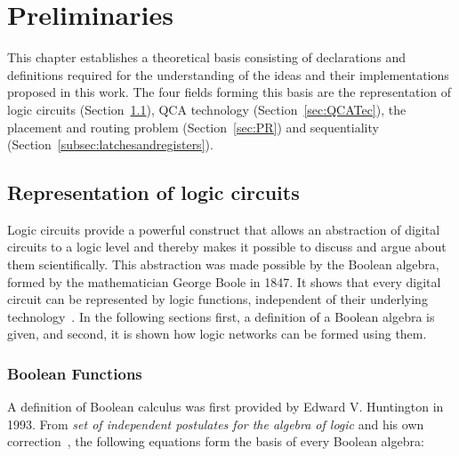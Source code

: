 \chapter{Preliminaries}\label{chapter:Preliminaries}
This chapter establishes a theoretical basis consisting of declarations and definitions required for the understanding of the ideas and their implementations proposed in this work. The four fields forming this basis are the representation of logic circuits (Section~\ref{sec:LogCirc}), QCA technology (Section~\ref{sec:QCATec}), the placement and routing problem (Section~\ref{sec:PR}) and sequentiality (Section~\ref{subsec:latchesandregisters}).

\section{Representation of logic circuits}\label{sec:LogCirc}
Logic circuits provide a powerful construct that allows an abstraction of digital circuits to a logic level and thereby makes it possible to discuss and argue about them scientifically. This abstraction was made possible by the Boolean algebra, formed by the mathematician George Boole in 1847. It shows that every digital circuit can be represented by logic functions, independent of their underlying technology~\cite{halmos2009introduction}. In the following sections first, a definition of a Boolean algebra is given, and second, it is shown how logic networks can be formed using them.

\subsection{Boolean Functions}\label{subsec:boolfunc}
A definition of Boolean calculus was first provided by Edward V. Huntington in 1993. From \textit{set of independent postulates for the algebra of logic} and his own correction~\cite{HuntingtonPostulate, HuntingtonCorrection}, the following equations form the basis of every Boolean algebra:

